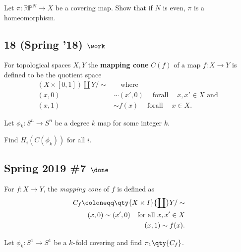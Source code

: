 Let \(\pi :{\mathbb{RP}}^N \to X\) be a covering map. Show that if \(N\)
is even, \(\pi\) is a homeomorphism.

\hypertarget{spring-18-work-1}{%
\subsection{\texorpdfstring{18 (Spring '18)
\(\work\)}{18 (Spring '18) \textbackslash work}}\label{spring-18-work-1}}

For topological spaces \(X, Y\) the \textbf{mapping cone} \(C(f )\) of a
map \(f : X \to Y\) is defined to be the quotient space
\begin{align*}  
(X \times [0, 1]){\coprod}Y / \sim &{\quad \operatorname{where} \quad}  \\ 
(x, 0) &\sim (x', 0) {\quad \operatorname{for all} \quad} x, x' \in X \text{ and } \\ 
(x, 1) &\sim f (x) {\quad \operatorname{for all } \quad} x \in X
.\end{align*}

Let \(\phi_k : S^n \to S^n\) be a degree \(k\) map for some integer
\(k\).

Find \(H_i(C(\phi_k ))\) for all \(i\).

\hypertarget{spring-2019-7-done}{%
\subsection{\texorpdfstring{Spring 2019 \#7
\(\done\)}{Spring 2019 \#7 \textbackslash done}}\label{spring-2019-7-done}}

For \(f:X\to Y\), the \emph{mapping cone} of \(f\) is defined as
\begin{align*}  
C_f \coloneqq\qty{X\times I} {\coprod}Y/\sim \\
(x, 0) \sim (x', 0) \quad \text{for all }x, x'\in X\\
(x, 1) \sim f(x)
.\end{align*}

Let \(\phi_k: S^1\to S^1\) be a \(k{\hbox{-}}\)fold covering and find
\(\pi_1\qty{C_f}\).


